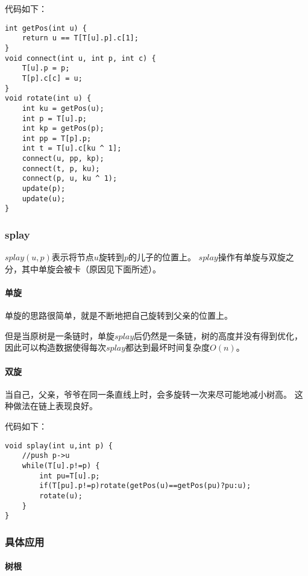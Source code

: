 代码如下：

\begin{lstlisting}[title=rotate]
int getPos(int u) {
    return u == T[T[u].p].c[1];
}
void connect(int u, int p, int c) {
    T[u].p = p;
    T[p].c[c] = u;
}
void rotate(int u) {
    int ku = getPos(u);
    int p = T[u].p;
    int kp = getPos(p);
    int pp = T[p].p;
    int t = T[u].c[ku ^ 1];
    connect(u, pp, kp);
    connect(t, p, ku);
    connect(p, u, ku ^ 1);
    update(p);
    update(u);
}
\end{lstlisting}

\subsubsection{splay}

$splay(u,p)$表示将节点$u$旋转到$p$的儿子的位置上。
$splay$操作有单旋与双旋之分，其中单旋会被卡（原因见下面所述）。

\paragraph{单旋}

单旋的思路很简单，就是不断地把自己旋转到父亲的位置上。

但是当原树是一条链时，单旋$splay$后仍然是一条链，树的高度并没有得到优化，
因此可以构造数据使得每次$splay$都达到最坏时间复杂度$O(n)$。

\paragraph{双旋}

当自己，父亲，爷爷在同一条直线上时，会多旋转一次来尽可能地减小树高。
这种做法在链上表现良好。

代码如下：

\begin{lstlisting}[title=splay]
void splay(int u,int p) {
    //push p->u
    while(T[u].p!=p) {
        int pu=T[u].p;
        if(T[pu].p!=p)rotate(getPos(u)==getPos(pu)?pu:u);
        rotate(u);
    }
}
\end{lstlisting}

\subsubsection{具体应用}

\paragraph{树根}

